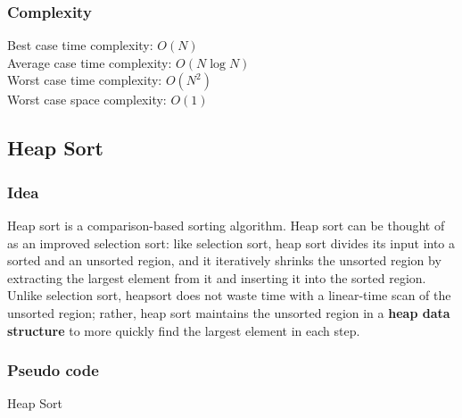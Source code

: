 \documentclass[11pt,a4paper]{article}
\newcommand\tab[1][1cm]{\hspace*{#1}}
\begin{document}
\subsubsection*{Complexity}
Best case time complexity: $O(N)$ \\
Average case time complexity: $O(N\log N)$\\
Worst case time complexity: $O(N^2)$ \\
Worst case space complexity: $O(1)$

\subsection{Heap Sort}
\subsubsection*{Idea}
Heap sort is a comparison-based sorting algorithm. 
Heap sort can be thought of as an improved selection sort: like selection sort, heap sort divides its input into a sorted and an unsorted region, and it iteratively shrinks the unsorted region by extracting the largest element from it and inserting it into the sorted region. 
\newline
\tab Unlike selection sort, heapsort does not waste time with a linear-time scan of the unsorted region; rather, heap sort maintains the unsorted region 
in a \textbf{heap data structure} to more quickly find the largest element in each step.

\subsubsection*{Pseudo code}
\begin{algorithm2e}
  \SetAlgoLined


  \caption{Heap Sort}
\end{algorithm2e}
\end{document}
